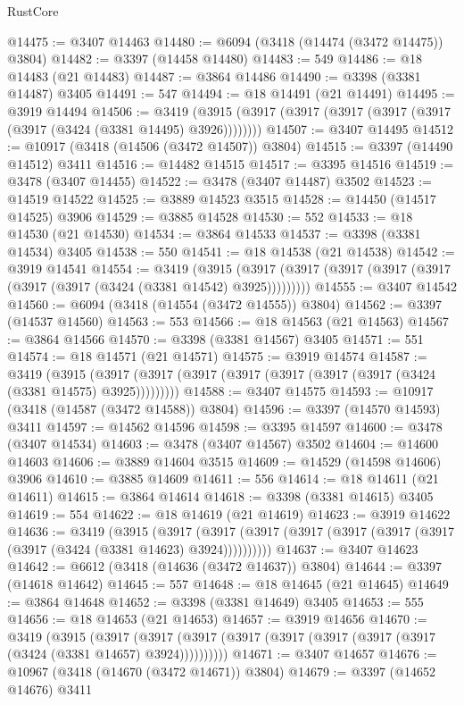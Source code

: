 \begin{lexlean}{RustCore}
\begin{coremodule}
@14475 := @3407 @14463
@14480 := @6094 (@3418 (@14474 (@3472 @14475)) @3804)
@14482 := @3397 (@14458 @14480)
@14483 := 549
@14486 := @18 @14483 (@21 @14483)
@14487 := @3864 @14486
@14490 := @3398 (@3381 @14487) @3405
@14491 := 547
@14494 := @18 @14491 (@21 @14491)
@14495 := @3919 @14494
@14506 := @3419 (@3915 (@3917 (@3917 (@3917 (@3917 (@3917 (@3917 (@3424 (@3381 @14495) @3926))))))))
@14507 := @3407 @14495
@14512 := @10917 (@3418 (@14506 (@3472 @14507)) @3804)
@14515 := @3397 (@14490 @14512) @3411
@14516 := @14482 @14515
@14517 := @3395 @14516
@14519 := @3478 (@3407 @14455)
@14522 := @3478 (@3407 @14487) @3502
@14523 := @14519 @14522
@14525 := @3889 @14523 @3515
@14528 := @14450 (@14517 @14525) @3906
@14529 := @3885 @14528
@14530 := 552
@14533 := @18 @14530 (@21 @14530)
@14534 := @3864 @14533
@14537 := @3398 (@3381 @14534) @3405
@14538 := 550
@14541 := @18 @14538 (@21 @14538)
@14542 := @3919 @14541
@14554 := @3419
    (@3915 (@3917 (@3917 (@3917 (@3917 (@3917 (@3917 (@3917 (@3424 (@3381 @14542) @3925)))))))))
@14555 := @3407 @14542
@14560 := @6094 (@3418 (@14554 (@3472 @14555)) @3804)
@14562 := @3397 (@14537 @14560)
@14563 := 553
@14566 := @18 @14563 (@21 @14563)
@14567 := @3864 @14566
@14570 := @3398 (@3381 @14567) @3405
@14571 := 551
@14574 := @18 @14571 (@21 @14571)
@14575 := @3919 @14574
@14587 := @3419
    (@3915 (@3917 (@3917 (@3917 (@3917 (@3917 (@3917 (@3917 (@3424 (@3381 @14575) @3925)))))))))
@14588 := @3407 @14575
@14593 := @10917 (@3418 (@14587 (@3472 @14588)) @3804)
@14596 := @3397 (@14570 @14593) @3411
@14597 := @14562 @14596
@14598 := @3395 @14597
@14600 := @3478 (@3407 @14534)
@14603 := @3478 (@3407 @14567) @3502
@14604 := @14600 @14603
@14606 := @3889 @14604 @3515
@14609 := @14529 (@14598 @14606) @3906
@14610 := @3885 @14609
@14611 := 556
@14614 := @18 @14611 (@21 @14611)
@14615 := @3864 @14614
@14618 := @3398 (@3381 @14615) @3405
@14619 := 554
@14622 := @18 @14619 (@21 @14619)
@14623 := @3919 @14622
@14636 := @3419
    (@3915
      (@3917 (@3917 (@3917 (@3917 (@3917 (@3917 (@3917 (@3917 (@3424 (@3381 @14623) @3924))))))))))
@14637 := @3407 @14623
@14642 := @6612 (@3418 (@14636 (@3472 @14637)) @3804)
@14644 := @3397 (@14618 @14642)
@14645 := 557
@14648 := @18 @14645 (@21 @14645)
@14649 := @3864 @14648
@14652 := @3398 (@3381 @14649) @3405
@14653 := 555
@14656 := @18 @14653 (@21 @14653)
@14657 := @3919 @14656
@14670 := @3419
    (@3915
      (@3917 (@3917 (@3917 (@3917 (@3917 (@3917 (@3917 (@3917 (@3424 (@3381 @14657) @3924))))))))))
@14671 := @3407 @14657
@14676 := @10967 (@3418 (@14670 (@3472 @14671)) @3804)
@14679 := @3397 (@14652 @14676) @3411

\end{coremodule}
\end{lexlean}
